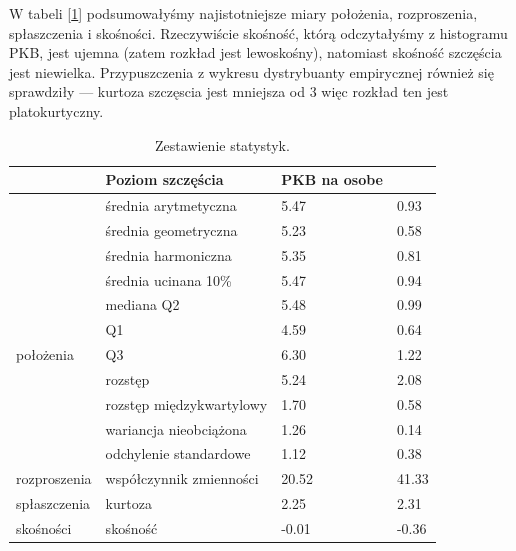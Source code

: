\documentclass{article}
\theoremstyle{break}
\begin{document}
W tabeli [\ref{table}] podsumowałyśmy najistotniejsze miary położenia, rozproszenia, spłaszczenia i skośności. Rzeczywiście skośność, którą odczytałyśmy z histogramu PKB, jest ujemna (zatem rozkład jest lewoskośny), natomiast skośność szczęścia jest niewielka. Przypuszczenia z wykresu dystrybuanty empirycznej również się sprawdziły --- kurtoza szczęscia jest mniejsza od 3 więc rozkład ten jest platokurtyczny. 


\begin{table}[H]
	\centering
	\begin{tabular}{|ll|l|l|}
		\hline
		\rowcolor[HTML]{C0C0C0} 
		\multicolumn{2}{|l|}{\cellcolor[HTML]{C0C0C0}Miary}                             & Poziom szczęścia & PKB na osobe \\ \hline
		\multicolumn{1}{|l|}{}                               & średnia arytmetyczna     & 5.47             & 0.93         \\ \cline{2-4} 
		\multicolumn{1}{|l|}{}                               & średnia geometryczna     & 5.23             & 0.58         \\ \cline{2-4} 
		\multicolumn{1}{|l|}{}                               & średnia harmoniczna      & 5.35             & 0.81         \\ \cline{2-4} 
		\multicolumn{1}{|l|}{}                               & średnia ucinana 10\%     & 5.47             & 0.94         \\ \cline{2-4} 
		\multicolumn{1}{|l|}{}                               & mediana Q2               & 5.48             & 0.99         \\ \cline{2-4} 
		\multicolumn{1}{|l|}{}                               & Q1                       & 4.59             & 0.64         \\ \cline{2-4} 
		\multicolumn{1}{|l|}{położenia}    & Q3                       & 6.30             & 1.22         \\ \hline
		\multicolumn{1}{|l|}{}                               & rozstęp                  & 5.24             & 2.08         \\ \cline{2-4} 
		\multicolumn{1}{|l|}{}                               & rozstęp międzykwartylowy & 1.70             & 0.58         \\ \cline{2-4} 
		\multicolumn{1}{|l|}{}                               & wariancja nieobciążona   & 1.26             & 0.14         \\ \cline{2-4} 
		\multicolumn{1}{|l|}{}                               & odchylenie standardowe   & 1.12             & 0.38         \\ \cline{2-4} 
		\multicolumn{1}{|l|}{rozproszenia} & współczynnik zmienności  & 20.52            & 41.33        \\ \hline
		\multicolumn{1}{|l|}{spłaszczenia}                   & kurtoza                  & 2.25             & 2.31         \\ \hline
		\multicolumn{1}{|l|}{skośności}                      & skośność                 & -0.01            & -0.36        \\ \hline
	\end{tabular}
\caption{Zestawienie statystyk.}
\label{table}
\end{table}
	
\end{document}
